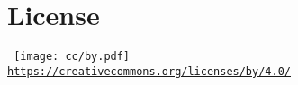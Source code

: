 
\thispagestyle{empty} %
\flushbottom %
\maketitle %



\section*{License}

    \scriptsize\noindent%
    \begin{minipage}{\columnwidth}
        \centering\tt
        \texttt{[image: cc/by.pdf]}\\[0.5\smallskipamount]
        {\scriptsize\url{https://creativecommons.org/licenses/by/4.0/}}
    \end{minipage}
    \normalsize



\tableofcontents



